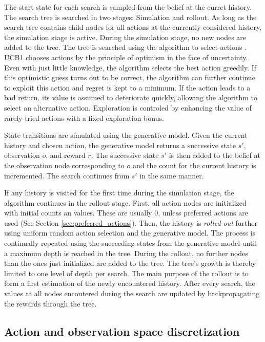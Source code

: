 The start state for each search is sampled from the belief at the curret history. The search tree is searched in two stages: Simulation and rollout. As long as the search tree contains child nodes for all actions at the currently considered history, the simulation stage is active. During the simulation stage, no new nodes are added to the tree. The tree is searched using the  algorithm to select actions \parencite{ucb1}. UCB1 chooses actions by the principle of optimism in the face of uncertainty. Even with just little knowledge, the algorithm selects the best action greedily. If this optimistic guess turns out to be correct, the algorithm can further continue to exploit this action and regret is kept to a minimum. If the action leads to a bad return, its value is assumed to deteriorate quickly, allowing the algorithm to select an alternative action. Exploration is controled by enhancing the value of rarely-tried actions with a fixed exploration bonus. 

State transitions are simulated using the generative model. Given the current history and chosen action, the generative model returns a successive state $s'$, observation $o$, and reward $r$. The successive state $s'$ is then added to the belief at the observation node corresponding to $o$ and the count for the current history is incremented. The search continues from $s'$ in the same manner. 

If any history is visited for the first time during the simulation stage, the algorithm continues in the rollout stage. First, all action nodes are initialized with initial counts an values. These are usually 0, unless preferred actions are used (See Section \ref{sec:preferred_actions}). Then, the history is \textit{rolled out} further using uniform random action selection and the generative model. The process is continually repeated using the succeeding states from the generative model until a maximum depth is reached in the tree. During the rollout, no further nodes than the ones just initialized are added to the tree. The tree's growth is thereby limited to one level of depth per search. The main purpose of the rollout is to form a first estimation of the newly encountered history. After every search, the values at all nodes encoutered during the search are updated by backpropagating the rewards through the tree.

\subsection{Action and observation space discretization}
\label{sec:discretization}

